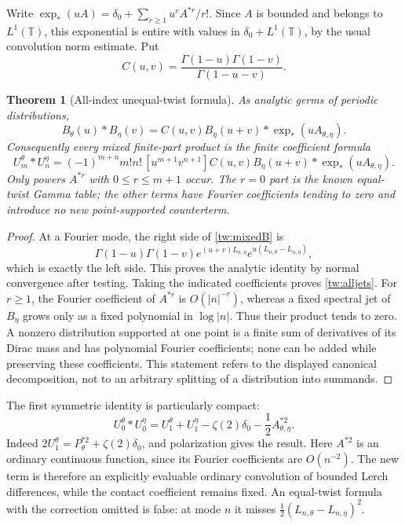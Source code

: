\documentclass[11pt,a4paper]{article}
\numberwithin{equation}{section}
\newtheorem{theorem}{Theorem}[section]
\theoremstyle{definition}
\theoremstyle{remark}
\newcommand{\T}{\mathbb T}
\begin{document}
Write $\exp_*(uA)=\delta_0+\sum_{r\ge1}u^r A^{*r}/r!$.
Since $A$ is bounded and belongs to $L^1(\T)$, this exponential is
entire with values in $\delta_0+L^1(\T)$, by the usual convolution
norm estimate. Put
\begin{equation}
 C(u,v)=\frac{\Gamma(1-u)\Gamma(1-v)}{\Gamma(1-u-v)}.
 \label{tw:C}
\end{equation}

\begin{theorem}[All-index unequal-twist formula]
\label{tw:jets}
As analytic germs of periodic distributions,
\begin{equation}
 B_\theta(u)*B_\eta(v)
       =C(u,v)B_\eta(u+v)*\exp_*(uA_{\theta,\eta}).
 \label{tw:mixedB}
\end{equation}
Consequently every mixed finite-part product is the finite coefficient
formula
\begin{equation}
 U_m^\theta*U_n^\eta
  =(-1)^{m+n}m!n!\,[u^{m+1}v^{n+1}]
       C(u,v)B_\eta(u+v)*\exp_*(uA_{\theta,\eta}).
 \label{tw:alljets}
\end{equation}
Only powers $A^{*r}$ with $0\le r\le m+1$ occur. The $r=0$
part is the known equal-twist Gamma table; the other terms have Fourier
coefficients tending to zero and introduce no new point-supported
counterterm.
\end{theorem}

\begin{proof}
At a Fourier mode, the right side of \eqref{tw:mixedB} is
\[
 \Gamma(1-u)\Gamma(1-v)
      e^{(u+v)L_{n,\eta}}
      e^{u(L_{n,\theta}-L_{n,\eta})},
\]
which is exactly the left side. This proves the analytic identity by
normal convergence after testing. Taking the indicated coefficients
proves \eqref{tw:alljets}. For $r\ge1$, the Fourier coefficient of
$A^{*r}$ is $O(|n|^{-r})$, whereas a fixed spectral jet of
$B_\eta$ grows only as a fixed polynomial in $\log|n|$. Thus their
product tends to zero. A nonzero distribution supported at one point
is a finite sum of derivatives of its Dirac mass and has polynomial
Fourier coefficients; none can be added while preserving these
coefficients. This statement refers to the displayed canonical
decomposition, not to an arbitrary splitting of a distribution into
summands.
\end{proof}

The first symmetric identity is particularly compact:
\begin{equation}
 \boxed{\quad
 U_0^\theta*U_0^\eta
   =U_1^\theta+U_1^\eta-\zeta(2)\delta_0
                     -\frac12 A_{\theta,\eta}^{*2}.
 \quad}
 \label{tw:firstmixed}
\end{equation}
Indeed $2U_1^\theta=P_\theta^{*2}+\zeta(2)\delta_0$,
and polarization gives the result. Here $A^{*2}$ is an ordinary
continuous function, since its Fourier coefficients are $O(n^{-2})$.
The new term is therefore an explicitly evaluable ordinary convolution
of bounded Lerch differences, while the contact coefficient remains
fixed. An equal-twist formula with the correction omitted is false:
at mode $n$ it misses $\tfrac12(L_{n,\theta}-L_{n,\eta})^2$.
\end{document}
